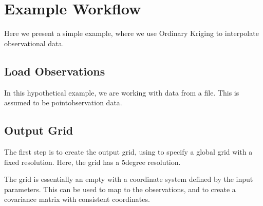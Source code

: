 \documentclass[letterpaper,10pt,english]{sphinxmanual}
\begin{document}
\sphinxstepscope


\chapter{Example Workflow}
\label{\detokenize{workflow:example-workflow}}\label{\detokenize{workflow::doc}}
\sphinxAtStartPar
Here we present a simple example, where we use Ordinary Kriging to interpolate observational data.


\section{Load Observations}
\label{\detokenize{workflow:load-observations}}
\sphinxAtStartPar
In this hypothetical example, we are working with data from a  file. This is assumed to be
point\sphinxhyphen{}observation data.

\begin{sphinxVerbatim}[commandchars=\\\{\}]
   
\end{sphinxVerbatim}


\section{Output Grid}
\label{\detokenize{workflow:output-grid}}
\sphinxAtStartPar
The first step is to create the output grid, using
{\hyperref[\detokenize{covariance:glomar_gridding.grid.grid_from_resolution}]{}} to specify a global grid with a fixed
resolution. Here, the grid has a 5\sphinxhyphen{}degree resolution.

\sphinxAtStartPar
The grid is essentially an empty  with a coordinate system defined by the input
parameters. This can be used to map to the observations, and to create a covariance matrix with
consistent coordinates.

\begin{sphinxVerbatim}[commandchars=\\\{\}]
  
    \PYG{p}{[}   \PYG{p}{]}
    \PYG{p}{[} \PYG{p}{]}
\end{sphinxVerbatim}
\end{document}

